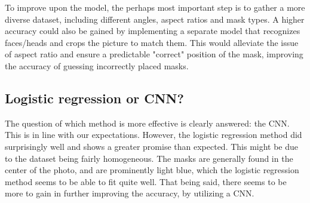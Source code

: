 \documentclass[../main.tex]{subfiles}
\begin{document}
To improve upon the model, the perhaps most important step is to gather a more diverse dataset, including different angles, aspect ratios and mask types. A higher accuracy could also be gained by implementing a separate model that recognizes faces/heads and crops the picture to match them. This would alleviate the issue of aspect ratio and ensure a predictable "correct" position of the mask, improving the accuracy of guessing incorrectly placed masks.

\subsection{Logistic regression or CNN?}
The question of which method is more effective is clearly answered: the CNN. This is in line with our expectations. However, the logistic regression method did surprisingly well and shows a greater promise than expected. This might be due to the dataset being fairly homogeneous. The masks are generally found in the center of the photo, and are prominently light blue, which the logistic regression method seems to be able to fit quite well. That being said, there seems to be more to gain in further improving the accuracy, by utilizing a CNN.
\end{document}
